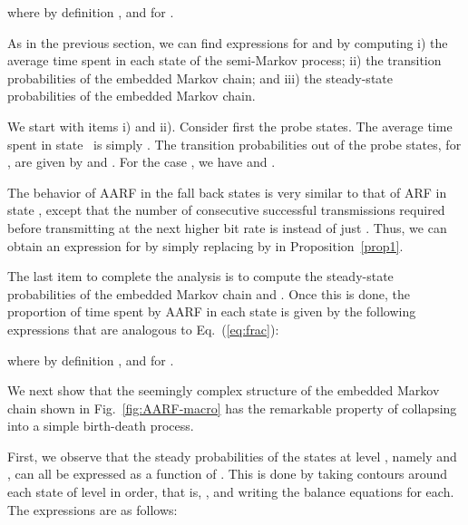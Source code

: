 \documentclass[11pt, journal, letterpaper, oneside, onecolumn]{IEEEtran}
\begin{document}
where by definition , and
 for .

As in the previous section, we can find expressions for
 and  by computing i) the
average time spent in each state of the semi-Markov process; ii)
the transition probabilities of the embedded Markov chain; and
iii) the steady-state probabilities of the embedded Markov chain.


We start with items i) and ii). Consider first the probe states. The
average time spent in state~  is simply
.
The transition probabilities out of the probe states, for , are given by
 and
.
For the case , we have
 and
.

The behavior of AARF in the fall back states  is very
similar to that of ARF in state , except that the number of
consecutive successful transmissions required before transmitting
at the next higher bit rate is  instead of
just . Thus, we can obtain an expression for  by simply replacing  by  in Proposition~\ref{prop1}.


The last item to complete the analysis is to compute the
steady-state probabilities of the embedded Markov chain
 and .  Once this is done,
the proportion of time spent by AARF in each state is given by the
following expressions that are analogous to Eq.~(\ref{eq:frac}):

where by definition , and
 for .







We next show that the seemingly complex structure of the embedded
Markov chain shown in Fig.~\ref{fig:AARF-macro} has the remarkable
property of collapsing into a simple birth-death process.

First, we observe that the steady probabilities of the states at
level , namely  and ,
can all be expressed as a function of . This is done
by taking contours around each state of level  in order, that
is, , and writing the
balance equations for each. The expressions are as follows:
\end{document}
